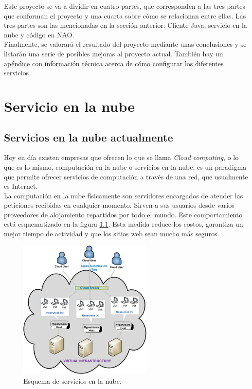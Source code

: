 \documentclass[12pt,spanish,listoffigures,listoftables]{tfgetsinf}
\begin{document}
Este proyecto se va a dividir en cuatro partes, que corresponden a las tres partes que conforman el proyecto y una cuarta sobre cómo se relacionan entre ellas. Las tres partes son las mencionadas en la sección anterior: Cliente Java, servicio en la nube y código en NAO. \\

Finalmente, se valorará el resultado del proyecto mediante unas conclusiones y se listarán una serie de posibles mejoras al proyecto actual. También hay un apéndice con información técnica acerca de cómo configurar los diferentes servicios.

\newpage
\chapter{Servicio en la nube}

\section{Servicios en la nube actualmente}

Hoy en día existen empresas que ofrecen lo que se llama \textit{Cloud computing}, o lo que es lo mismo, computación en la nube o servicios en la nube, es un paradigma que permite ofrecer servicios de computación a través de una red, que usualmente es Internet. \\

La computación en la nube físicamente son servidores encargados de atender las peticiones recibidas en cualquier momento. Sirven a sus usuarios desde varios proveedores de alojamiento repartidos por todo el mundo. Este comportamiento está esquematizado en la figura \ref{figura:cloudcomputescheme}. Esta medida reduce los costos, garantiza un mejor tiempo de actividad y que los sitios web sean mucho más seguros. \\

\begin{figure}[!h]
	\centering
	\includegraphics[height=7cm]{img/cloudcompute}
	\caption{Esquema de servicios en la nube.}
	\label{figura:cloudcomputescheme}
\end{figure}
\end{document}

